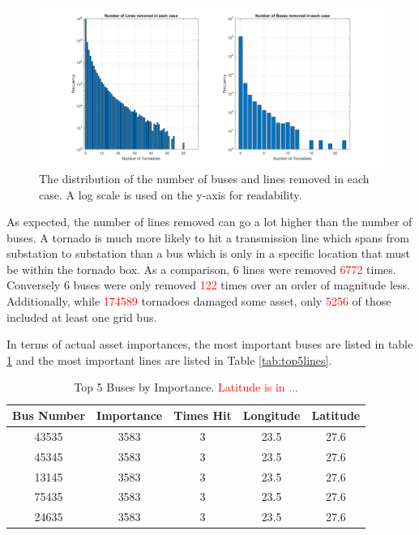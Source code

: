 \documentclass[12pt]{article}
\begin{document}
\begin{figure}[H]
    \centering %
    \includegraphics[width=\textwidth]{Assettypesremovedincases.png}
    \caption[Distribution of buses and lines removed in each case]{The distribution of the number of buses and lines removed in each case. A log scale is used on the y-axis for readability.}
    \label{fig:Assettypesremovedincases}
\end{figure}

As expected, the number of lines removed can go a lot higher than the number of buses. A tornado is much more likely to hit a transmission line which spans from substation to substation than a bus which is only in a specific location that must be within the tornado box. As a comparison, 6 lines were removed \textcolor{red}{6772} times. Conversely 6 buses were only removed \textcolor{red}{122} times over an order of magnitude less. Additionally, while \textcolor{red}{174589} tornadoes damaged some asset, only \textcolor{red}{5256} of those included at least one grid bus. \par

In terms of actual asset importances, the most important buses are listed in table \ref{tab:top5buses} and the most important lines are listed in Table \ref{tab:top5lines}.

\begin{table}[ht]
    \centering
    \begin{tabular}{ccccc}
        \toprule
        Bus Number & Importance & Times Hit & Longitude & Latitude \\
        \midrule
        43535 & 3583 & 3 & 23.5 & 27.6 \\
        45345 & 3583 & 3 & 23.5 & 27.6 \\
        13145 & 3583 & 3 & 23.5 & 27.6 \\
        75435 & 3583 & 3 & 23.5 & 27.6 \\
        24635 & 3583 & 3 & 23.5 & 27.6 \\
        \bottomrule
    \end{tabular}
    \caption[Top 5 Buses by Importance]{Top 5 Buses by Importance. \textcolor{red}{Latitude is in ...}}
    \label{tab:top5buses}
\end{table}
\end{document}
